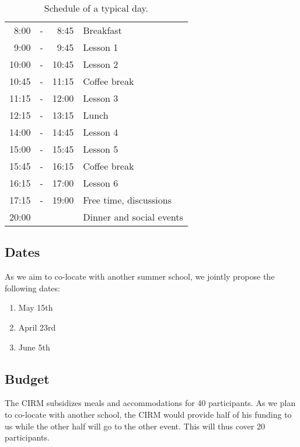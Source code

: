 \documentclass[a4paper]{scrartcl}
\begin{document}
\begin{table}[ht]
	\centering
	\begin{tabular}{rcrl}
	 8:00 & - &  8:45 & Breakfast \\
	 9:00 & - &  9:45 & Lesson 1 \\
	10:00 & - & 10:45 & Lesson 2 \\
	10:45 & - & 11:15 & Coffee break \\
	11:15 & - & 12:00 & Lesson 3 \\
	12:15 & - & 13:15 & Lunch \\
	14:00 & - & 14:45 & Lesson 4 \\
	15:00 & - & 15:45 & Lesson 5 \\
	15:45 & - & 16:15 & Coffee break \\
	16:15 & - & 17:00 & Lesson 6 \\
	17:15 & - & 19:00 & Free time, discussions \\
	20:00 &   &       &  Dinner and social events
	\end{tabular}
	\caption{Schedule of a typical day.}
	\label{schedule}
\end{table}

\subsection{Dates}

As we aim to co-locate with another summer school, we jointly propose the
following dates:
\begin{enumerate}
	\setlength{\itemsep}{0pt} \setlength{\parskip}{0pt}
	\item May 15th
	\item April 23rd
	\item June 5th
\end{enumerate}

\subsection{Budget}

The CIRM subsidizes meals and accommodations for 40 participants. As we plan to
co-locate with another school, the CIRM would provide half of his funding to us
while the other half will go to the other event. This will thus cover 20
participants.
\end{document}

